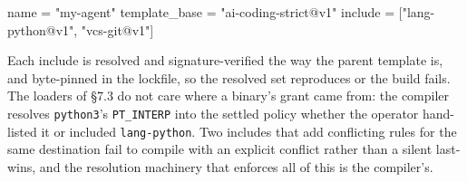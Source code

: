 \begin{kennelcode}
name = "my-agent"
template_base = "ai-coding-strict@v1"
include = ["lang-python@v1", "vcs-git@v1"]
\end{kennelcode}

Each include is resolved and signature-verified the way the parent
template is, and byte-pinned in the lockfile, so the resolved set
reproduces or the build fails. The loaders of §7.3 do not care where a
binary's grant came from: the compiler resolves \texttt{python3}'s
\texttt{PT\_INTERP} into the settled policy whether the operator
hand-listed it or included \texttt{lang-python}. Two includes that add
conflicting rules for the same destination fail to compile with an
explicit conflict rather than a silent last-wins, and the resolution
machinery that enforces all of this is the compiler's.
